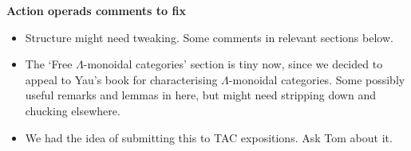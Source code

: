\documentclass{amsart}
\begin{document}
\begin{center}
\begin{Large}
\textbf{Action operads comments to fix}
\end{Large}
\end{center}
\vskip1cm

\begin{itemize}
	\item Structure might need tweaking. Some comments in relevant sections below.
	\item The `Free $\Lambda$-monoidal categories' section is tiny now, since we decided to appeal to Yau's book for characterising $\Lambda$-monoidal categories. Some possibly useful remarks and lemmas in here, but might need stripping down and chucking elsewhere.
	\item We had the idea of submitting this to TAC expositions. Ask Tom about it.
\end{itemize}
\end{document}
